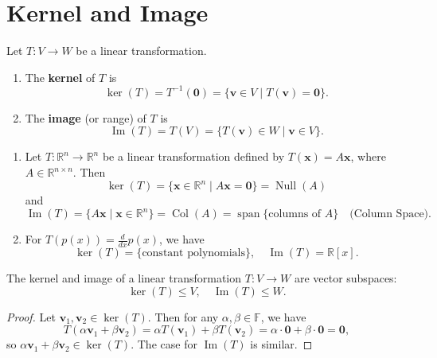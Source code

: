\section{Kernel and Image}
\begin{definition}
Let \( T : V \rightarrow W \) be a linear transformation.
\begin{enumerate}
    \item The \textbf{kernel} of \( T \) is
    \[
    \ker(T) = T^{-1}(\mathbf{0}) = \{ \mathbf{v} \in V \mid T(\mathbf{v}) = \mathbf{0} \}.
    \]

    \item The \textbf{image} (or range) of \( T \) is
    \[
    \operatorname{Im}(T) = T(V) =\{ T(\mathbf{v}) \in W \mid \mathbf{v} \in V \}.
    \]
\end{enumerate}
\end{definition}

\begin{example}
\hfill
\begin{enumerate}
    \item Let \( T : \mathbb{R}^n \rightarrow \mathbb{R}^n \) be a linear transformation defined by \( T(\mathbf{x}) = A\mathbf{x} \), where \( A \in \mathbb{R}^{n \times n} \). Then
    \[
    \ker(T) = \{ \mathbf{x} \in \mathbb{R}^n \mid A\mathbf{x} = \mathbf{0} \} = \operatorname{Null}(A)
    \]
    and
    \[
    \operatorname{Im}(T) = \{ A\mathbf{x} \mid \mathbf{x} \in \mathbb{R}^n \} = \operatorname{Col}(A) = \operatorname{span}\{\text{columns of } A\} \quad \text{(Column Space)}.
    \]

    \item For \( T(p(x)) = \frac{d}{dx}p(x) \), we have
    \[
    \ker(T) = \{ \text{constant polynomials} \}, \quad \operatorname{Im}(T) = \mathbb{R}[x].
    \]
\end{enumerate}
\end{example}

\begin{proposition}
The kernel and image of a linear transformation \( T : V \rightarrow W \) are vector subspaces:
\[
\ker(T) \leq V, \quad \operatorname{Im}(T) \leq W.
\]
\end{proposition}

\begin{proof}
Let \( \mathbf{v}_1, \mathbf{v}_2 \in \ker(T) \). Then for any \( \alpha, \beta \in \mathbb{F} \), we have
\[
T(\alpha \mathbf{v}_1 + \beta \mathbf{v}_2) = \alpha T(\mathbf{v}_1) + \beta T(\mathbf{v}_2) = \alpha \cdot \mathbf{0} + \beta \cdot \mathbf{0} = \mathbf{0},
\]
so \( \alpha \mathbf{v}_1 + \beta \mathbf{v}_2 \in \ker(T) \). The case for \( \operatorname{Im}(T) \) is similar.
\end{proof}

